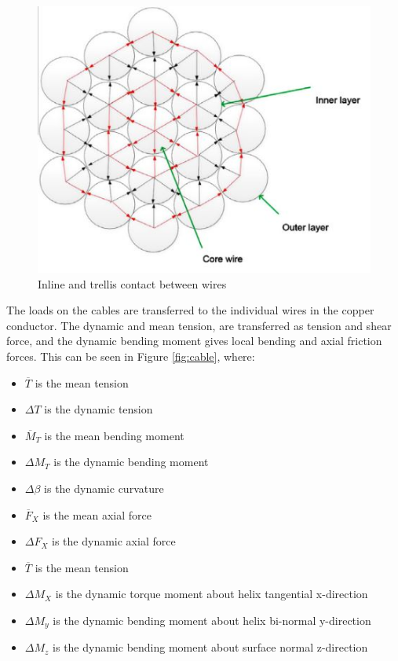   \begin{figure}[H]
\centering
\includegraphics[scale=0.9]{figures/cross}
\caption[$\; \:$Inline and trellis contact between wires]{Inline and trellis contact between wires \cite{Nasution2013} }
 \label{fig:cross}
\end{figure}

\noindent The loads on the cables are transferred to the individual wires in the copper conductor. The dynamic and mean tension, are transferred as tension and shear force, and the dynamic bending moment gives local bending and axial friction forces. This can be seen in Figure \ref{fig:cable}, where:
\begin{itemize}
    \item $\overline T$ is the mean tension
    \item $\Delta T$ is the dynamic tension
    \item $\overline M_T$ is the mean bending moment
    \item $\Delta M_T$ is the dynamic bending moment
    \item $\Delta \beta$ is the dynamic curvature
    \item $\overline F_X$ is the mean axial force
    \item $\Delta F_X$ is the dynamic axial force
    \item $\overline T$ is the mean tension
    \item $\Delta M_X$ is the dynamic torque moment about helix tangential x-direction
    \item $\Delta M_y$ is the dynamic bending moment about helix bi-normal y-direction
    \item $\Delta M_z$ is the dynamic bending moment about surface normal z-direction
\end{itemize}


